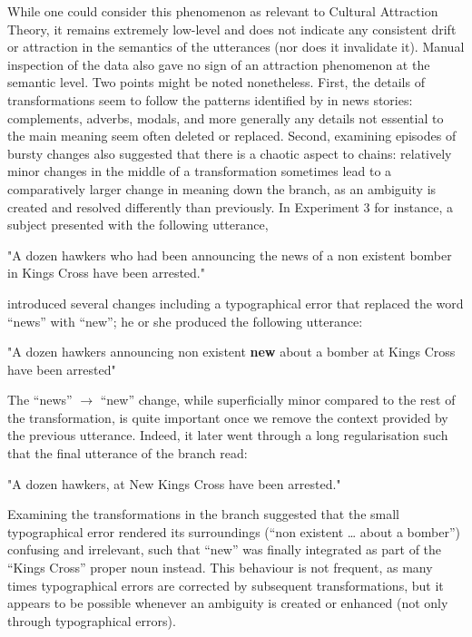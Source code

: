 While one could consider this phenomenon as relevant to Cultural
Attraction Theory, it remains extremely low-level and does not indicate
any consistent drift or attraction in the semantics of the utterances
(nor does it invalidate it). Manual inspection of the data also gave no
sign of an attraction phenomenon at the semantic level. Two points might
be noted nonetheless. First, the details of transformations seem to
follow the patterns identified by \textcite{lauf_analyzing_2013} in news
stories: complements, adverbs, modals, and more generally any details
not essential to the main meaning seem often deleted or replaced.
Second, examining episodes of bursty changes also suggested that there
is a chaotic aspect to chains: relatively minor changes in the middle of
a transformation sometimes lead to a comparatively larger change in
meaning down the branch, as an ambiguity is created and resolved
differently than previously. In Experiment 3 for instance, a subject
presented with the following utterance,

\begin{nquote} %
  "A dozen hawkers who had been announcing the news of a non existent bomber in Kings Cross have been arrested."
\end{nquote}

introduced several changes including a typographical error that replaced
the word \enquote{news} with \enquote{new}; he or she produced the
following utterance:

\begin{nquote} %
  "A dozen hawkers announcing non existent \textbf{new} about a bomber at Kings Cross have been arrested"
\end{nquote}

The \enquote{news} \(\rightarrow\) \enquote{new} change, while
superficially minor compared to the rest of the transformation, is quite
important once we remove the context provided by the previous utterance.
Indeed, it later went through a long regularisation such that the final
utterance of the branch read:

\begin{nquote} %
  "A dozen hawkers, at New Kings Cross have been arrested."
\end{nquote}

Examining the transformations in the branch suggested that the small
typographical error rendered its surroundings (\enquote{non existent
\ldots{} about a bomber}) confusing and irrelevant, such that
\enquote{new} was finally integrated as part of the \enquote{Kings
Cross} proper noun instead. This behaviour is not frequent, as many
times typographical errors are corrected by subsequent transformations,
but it appears to be possible whenever an ambiguity is created or
enhanced (not only through typographical errors).

